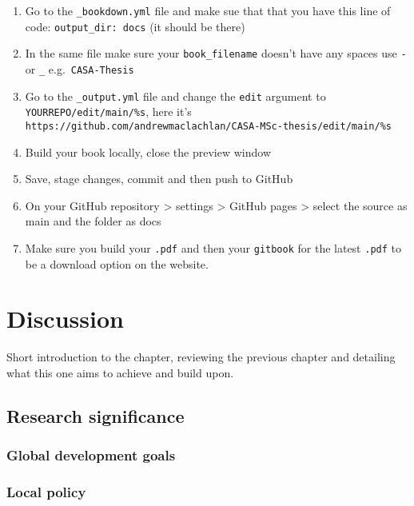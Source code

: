 \documentclass[
  12pt,
  oneside]{book}
\providecommand{\tightlist}{%
  \setlength{\itemsep}{0pt}\setlength{\parskip}{0pt}}
\begin{document}
\begin{enumerate}
\def\labelenumi{\arabic{enumi}.}
\tightlist
\item
  Go to the \texttt{\_bookdown.yml} file and make sue that that you have this line of code: \texttt{output\_dir:\ docs} (it should be there)
\item
  In the same file make sure your \texttt{book\_filename} doesn't have any spaces use \texttt{-} or \texttt{\_} e.g.~\texttt{CASA-Thesis}
\item
  Go to the \texttt{\_output.yml} file and change the \texttt{edit} argument to \texttt{YOURREPO/edit/main/\%s}, here it's \texttt{https://github.com/andrewmaclachlan/CASA-MSc-thesis/edit/main/\%s}
\item
  Build your book locally, close the preview window
\item
  Save, stage changes, commit and then push to GitHub
\item
  On your GitHub repository \textgreater{} settings \textgreater{} GitHub pages \textgreater{} select the source as main and the folder as docs
\item
  Make sure you build your \texttt{.pdf} and then your \texttt{gitbook} for the latest \texttt{.pdf} to be a download option on the website.
\end{enumerate}

\hypertarget{discussion}{%
\chapter{Discussion}\label{discussion}}

Short introduction to the chapter, reviewing the previous chapter and detailing what this one aims to achieve and build upon.

\hypertarget{research-significance}{%
\section{Research significance}\label{research-significance}}

\hypertarget{global-development-goals}{%
\subsection{Global development goals}\label{global-development-goals}}

\hypertarget{local-policy}{%
\subsection{Local policy}\label{local-policy}}
\end{document}
